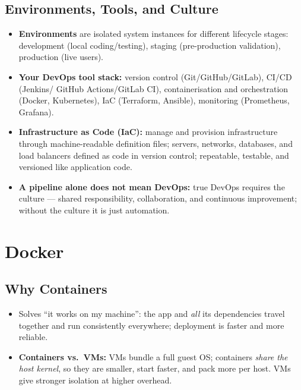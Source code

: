 \documentclass[hidelinks]{article}
\begin{document}
\subsection{Environments, Tools, and Culture}
\begin{itemize}
  \item \textbf{Environments} are isolated system instances for different lifecycle stages:
        development (local coding/testing), staging (pre-production validation), production (live users).
  \item \textbf{Your DevOps tool stack:} version control (Git/GitHub/GitLab), CI/CD (Jenkins/
        GitHub Actions/GitLab CI), containerisation and orchestration (Docker, Kubernetes), IaC
        (Terraform, Ansible), monitoring (Prometheus, Grafana).
  \item \textbf{Infrastructure as Code (IaC):} manage and provision infrastructure through
        machine-readable definition files; servers, networks, databases, and load balancers defined
        as code in version control; repeatable, testable, and versioned like application code.
  \item \textbf{A pipeline alone does not mean DevOps:} true DevOps requires the culture --- shared
        responsibility, collaboration, and continuous improvement; without the culture it is just
        automation.
\end{itemize}


\section{Docker}

\subsection{Why Containers}
\begin{itemize}
  \item Solves ``it works on my machine'': the app and \emph{all} its dependencies travel together
        and run consistently everywhere; deployment is faster and more reliable.
  \item \textbf{Containers vs.\ VMs:} VMs bundle a full guest OS; containers \emph{share the host
        kernel}, so they are smaller, start faster, and pack more per host. VMs give stronger
        isolation at higher overhead.
\end{itemize}
\end{document}
